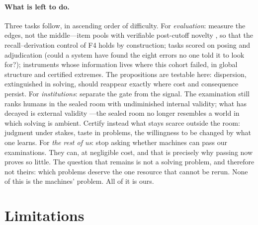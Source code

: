 \documentclass[11pt]{article}
\theoremstyle{plain}
\begin{document}
\paragraph{What is left to do.}
Three tasks follow, in ascending order of difficulty. For
\emph{evaluation}: measure the edges, not the middle---item pools with
verifiable post-cutoff novelty
\citep{white2025livebench,balunovic2025matharena}, so that the
recall--derivation control of
F4 holds by construction; tasks scored on posing and adjudication (could
a system have found the eight errors no one told it to look for?);
instruments whose information lives where this cohort failed, in global
structure and certified extremes. The propositions are testable here:
dispersion, extinguished in solving, should reappear exactly where cost
and consequence persist. For \emph{institutions}: separate the
gate from the signal. The examination still ranks humans in the sealed
room with undiminished internal validity; what has decayed is external
validity \citep{messick1989validity}---the sealed room no longer
resembles a world in which solving
is ambient. Certify instead what stays scarce outside the room: judgment
under stakes, taste in problems, the willingness to be changed by what
one learns. For \emph{the rest of us}: stop asking whether machines can
pass our examinations. They can, at negligible cost, and that is
precisely why passing now proves so little. The question that remains is
not a solving problem, and therefore not theirs: which problems deserve
the one resource that cannot be rerun. None of this is the machines'
problem. All of it is ours.

\section{Limitations}
\end{document}

